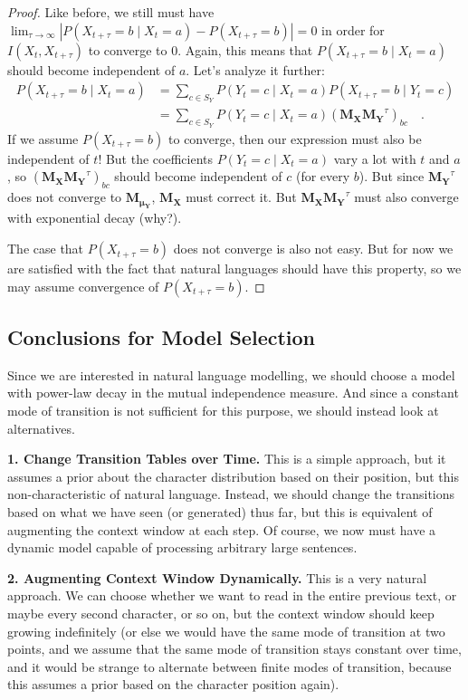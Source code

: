\documentclass[../../main.tex]{subfiles}
\begin{document}
\begin{proof}
        Like before, we still must have $\lim_{\tau \to \infty} |P(X_{t + \tau} = b \mid X_t = a) - P(X_{t + \tau} = b)| = 0$ in order for $I(X_t, X_{t + \tau})$ to converge to $0$. Again, this means that $P(X_{t + \tau} = b \mid X_t = a)$ should become independent of $a$.
        Let's analyze it further:
        \begin{align*}
            P(X_{t + \tau} = b \mid X_t = a) &= \sum_{c \in S_Y} P(Y_t = c \mid X_t = a) P(X_{t + \tau} = b \mid Y_t = c) \\
            &= \sum_{c \in S_Y} P(Y_t = c \mid X_t = a) (\bm{M_X} \bm{M_Y}^\tau)_{bc} \quad .
        \end{align*}
        If we assume $P(X_{t + \tau} = b)$ to converge, then our expression must also be independent of $t$! But the coefficients $P(Y_t = c \mid X_t = a)$ vary a lot with $t$ and $a$, so $(\bm{M_X} \bm{M_Y}^\tau)_{bc}$ should become independent of $c$ (for every $b$). But since $\bm{M_Y}^\tau$ does not converge to $\bm{M_{\mu_Y}}$, $\bm{M_X}$ must correct it. But $\bm{M_X} \bm{M_Y}^\tau$ must also converge with exponential decay (why?).

        The case that $P(X_{t + \tau} = b)$ does not converge is also not easy. But for now we are satisfied with the fact that natural languages should have this property, so we may assume convergence of $P(X_{t + \tau} = b)$.
    \end{proof}

    \smallskip
\subsection{Conclusions for Model Selection}
    Since we are interested in natural language modelling, we should choose a model with power-law decay in the mutual independence measure. And since a constant mode of transition is not sufficient for this purpose, we should instead look at alternatives.

    \textbf{1. Change Transition Tables over Time.} This is a simple approach, but it assumes a prior about the character distribution based on their position, but this non-characteristic of natural language. Instead, we should change the transitions based on what we have seen (or generated) thus far, but this is equivalent of augmenting the context window at each step. Of course, we now must have a dynamic model capable of processing arbitrary large sentences.

    \textbf{2. Augmenting Context Window Dynamically.} This is a very natural approach. We can choose whether we want to read in the entire previous text, or maybe every second character, or so on, but the context window should keep growing indefinitely (or else we would have the same mode of transition at two points, and we assume that the same mode of transition stays constant over time, and it would be strange to alternate between finite modes of transition, because this assumes a prior based on the character position again).
    
\end{document}
